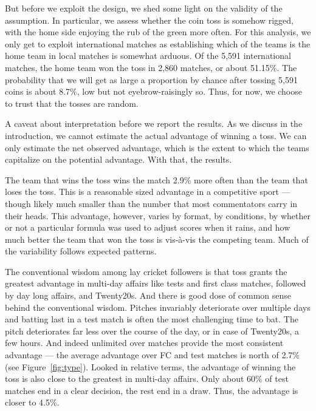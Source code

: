 \documentclass[12pt]{article}
\begin{document}
But before we exploit the design, we shed some light on the validity of the assumption. In particular, we assess whether the coin toss is somehow rigged, with the home side enjoying the rub of the green more often. For this analysis, we only get to exploit international matches as establishing which of the teams is the home team in local matches is somewhat arduous. Of the 5,591 international matches, the home team won the toss in 2,860 matches, or about 51.15\%. The probability that we will get as large a proportion by chance after tossing 5,591 coins is about 8.7\%, low but not eyebrow-raisingly so. Thus, for now, we choose to trust that the tosses are random.

A caveat about interpretation before we report the results. As we discuss in the introduction, we cannot estimate the actual advantage of winning a toss. We can only estimate the net observed advantage, which is the extent to which the teams capitalize on the potential advantage. With that, the results.

The team that wins the toss wins the match 2.9\% more often than the team that loses the toss. This is a reasonable sized advantage in a competitive sport --- though likely much smaller than the number that most commentators carry in their heads.
This advantage, however, varies by format, by conditions, by whether or not a particular formula was used to adjust scores when it rains, and how much better the team that won the toss is vis-\`{a}-vis the competing team. Much of the variability follows expected patterns.

The conventional wisdom among lay cricket followers is that toss grants the greatest advantage in multi-day affairs like tests and first class matches, followed by day long affairs, and Twenty20s. And there is good dose of common sense behind the conventional wisdom. Pitches invariably deteriorate over multiple days and batting last in a test match is often the most challenging time to bat. The pitch deteriorates far less over the course of the day, or in case of Twenty20s, a few hours. And indeed unlimited over matches provide the most consistent advantage --- the average advantage over FC and test matches is north of 2.7\% (see Figure~\ref{fig:type}). Looked in relative terms, the advantage of winning the toss is also close to the greatest in multi-day affairs. Only about 60\% of test matches end in a  clear decision, the rest end in a draw. Thus, the advantage is closer to 4.5\%. 
\end{document}
